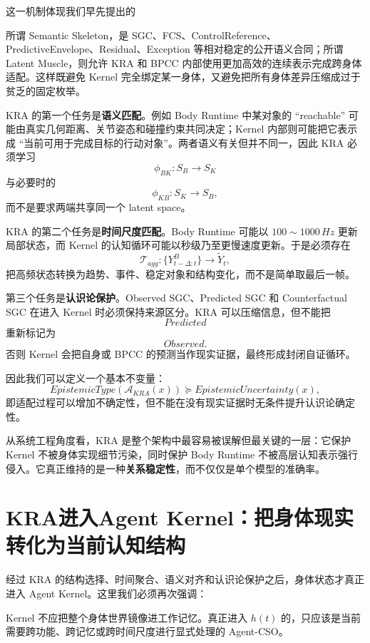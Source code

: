这一机制体现我们早先提出的
\begin{statementbox}
\centering
{}
\end{statementbox}
所谓 Semantic Skeleton，是 SGC、FCS、ControlReference、PredictiveEnvelope、Residual、Exception 等相对稳定的公开语义合同；所谓 Latent Muscle，则允许 KRA 和 BPCC 内部使用更加高效的连续表示完成跨身体适配。这样既避免 Kernel 完全绑定某一身体，又避免把所有身体差异压缩成过于贫乏的固定枚举。

KRA 的第一个任务是\textbf{语义匹配}。例如 Body Runtime 中某对象的 ``reachable'' 可能由真实几何距离、关节姿态和碰撞约束共同决定；Kernel 内部则可能把它表示成 ``当前可用于完成目标的行动对象''。两者语义有关但并不同一，因此 KRA 必须学习
\[
\phi_{BK}:S_B\rightarrow S_K
\]
与必要时的
\[
\phi_{KB}:S_K\rightarrow S_B ,
\]
而不是要求两端共享同一个 latent space。

KRA 的第二个任务是\textbf{时间尺度匹配}。Body Runtime 可能以 $100\sim1000\,Hz$ 更新局部状态，而 Kernel 的认知循环可能以秒级乃至更慢速度更新。于是必须存在
\[
\mathcal T_{agg}:
\{Y^B_{t-\Delta:t}\}
\rightarrow
\tilde Y_t ,
\]
把高频状态转换为趋势、事件、稳定对象和结构变化，而不是简单取最后一帧。

第三个任务是\textbf{认识论保护}。Observed SGC、Predicted SGC 和 Counterfactual SGC 在进入 Kernel 时必须保持来源区分。KRA 可以压缩信息，但不能把
\[
Predicted
\]
重新标记为
\[
Observed .
\]
否则 Kernel 会把自身或 BPCC 的预测当作现实证据，最终形成封闭自证循环。

因此我们可以定义一个基本不变量：
\[
\boxed{
EpistemicType
\left(
\mathcal A_{KRA}(x)
\right)
\succeq
EpistemicUncertainty(x) ,
}
\]
即适配过程可以增加不确定性，但不能在没有现实证据时无条件提升认识论确定性。

从系统工程角度看，KRA 是整个架构中最容易被误解但最关键的一层：它保护 Kernel 不被身体实现细节污染，同时保护 Body Runtime 不被高层认知表示强行侵入。它真正维持的是一种\textbf{关系稳定性}，而不仅仅是单个模型的准确率。


\section{KRA进入Agent Kernel：把身体现实转化为当前认知结构}

经过 KRA 的结构选择、时间聚合、语义对齐和认识论保护之后，身体状态才真正进入 Agent Kernel。这里我们必须再次强调：
\begin{statementbox}
\centering
{}
\end{statementbox}
Kernel 不应把整个身体世界镜像进工作记忆。真正进入 $h(t)$ 的，只应该是当前需要跨功能、跨记忆或跨时间尺度进行显式处理的 Agent-CSO。

